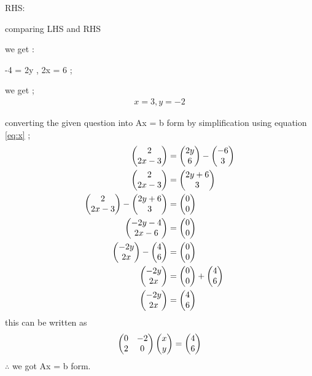 \documentclass[journal,12pt,twocolumn]{IEEEtran}
\begin{document}
		{RHS}:              
		
		comparing {LHS} and {RHS}
		
		we get :

			-4 = 2y , 2x = 6 ;
		
		we get ;
		\begin{align}
			x = 3 , y = -2
		\end{align}
		
		\newpage
		converting the given question into Ax = b form 
		by simplification using equation \eqref{eq:x} ;
		\begin{align}
			\begin{pmatrix}2\\2x-3 \end{pmatrix} &= \begin{pmatrix}2y\\6\end{pmatrix} - \begin{pmatrix}-6\\3\end{pmatrix} 
			\\ 
			\begin{pmatrix}2\\2x-3 \end{pmatrix} &= \begin{pmatrix}2y+6\\3\end{pmatrix}
			\\ 
			\begin{pmatrix}2\\2x-3 \end{pmatrix} - \begin{pmatrix}2y+6\\3\end{pmatrix} &= \begin{pmatrix}0\\0\end{pmatrix}
			\\
			\begin{pmatrix}-2y-4\\2x-6 \end{pmatrix} &= \begin{pmatrix}0\\0\end{pmatrix}
			\\
			\begin{pmatrix}-2y\\2x\end{pmatrix} -\begin{pmatrix}4\\6\end{pmatrix} &= \begin{pmatrix}0\\0\end{pmatrix}
			\\
			\begin{pmatrix}-2y\\2x \end{pmatrix} &= \begin{pmatrix}0\\0\end{pmatrix} + \begin{pmatrix}4\\6\end{pmatrix}
			\\
			\begin{pmatrix}-2y\\2x \end{pmatrix} &= \begin{pmatrix}4\\6\end{pmatrix}
		\end{align}
		this can be written as 
		\begin{align}
			\begin{pmatrix}0 & -2\\2 & 0\end{pmatrix} \begin{pmatrix}x\\y\end{pmatrix}= \begin{pmatrix}4\\6\end{pmatrix}
		\end{align}
		$\therefore$ we got Ax = b form.  
	
\end{document}
